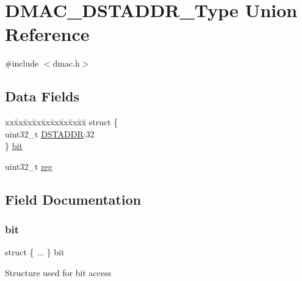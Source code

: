\hypertarget{union_d_m_a_c___d_s_t_a_d_d_r___type}{}\section{D\+M\+A\+C\+\_\+\+D\+S\+T\+A\+D\+D\+R\+\_\+\+Type Union Reference}
\label{union_d_m_a_c___d_s_t_a_d_d_r___type}


{\ttfamily \#include $<$dmac.\+h$>$}

\subsection*{Data Fields}
\begin{DoxyCompactItemize}
\item 
\begin{tabbing}
xx\=xx\=xx\=xx\=xx\=xx\=xx\=xx\=xx\=\kill
struct \{\\
\>uint32\_t \mbox{\hyperlink{union_d_m_a_c___d_s_t_a_d_d_r___type_afaf75bcaeaafe28afc31e77408538e5e}{DSTADDR}}:32\\
\} \mbox{\hyperlink{union_d_m_a_c___d_s_t_a_d_d_r___type_a342f01667fcec12ae6710bc21489af05}{bit}}\\

\end{tabbing}\item 
uint32\+\_\+t \mbox{\hyperlink{union_d_m_a_c___d_s_t_a_d_d_r___type_a6b91636401516a477989a336376d7b40}{reg}}
\end{DoxyCompactItemize}


\subsection{Field Documentation}
\mbox{\label{union_d_m_a_c___d_s_t_a_d_d_r___type_a342f01667fcec12ae6710bc21489af05}} 
\subsubsection{\texorpdfstring{bit}{bit}}
{\footnotesize\ttfamily struct \{ ... \}   bit}

Structure used for bit access \mbox{\label{union_d_m_a_c___d_s_t_a_d_d_r___type_afaf75bcaeaafe28afc31e77408538e5e}} 
